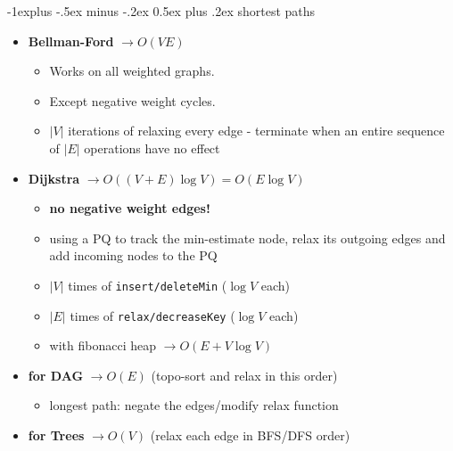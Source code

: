 \documentclass[10pt, landscape]{article}
\makeatletter
\renewcommand{\subsection}{\@startsection{subsection}{2}{0mm}%
                                {-1explus -.5ex minus -.2ex}%
                                {0.5ex plus .2ex}%
                                {\normalfont\normalsize\bfseries}}
\newcommand{\abs}[1]{\vert #1 \vert}
\let\then\rightarrow
\newcommand{\code}[1]{\textcolor{mygreen}{\texttt{#1}}}
\makeatother
\begin{document}
\begin{multicols}{4}
\subsection{shortest paths}
\begin{itemize}
    \item \textbf{Bellman-Ford} $\then O(VE)$
    \begin{itemize}
        \item Works on all weighted graphs.
        \item Except negative weight cycles.
        \item $\abs{V}$ iterations of relaxing every edge - terminate when an entire sequence of $\abs{E}$ operations have no effect
    \end{itemize}
    \item \textbf{Dijkstra} $\then O((V+E)\log V) = O(E\log V)$
    \begin{itemize}
        \item \textbf{no negative weight edges!}
        \item using a PQ to track the min-estimate node, relax its outgoing edges and add incoming nodes to the PQ
        \item $\abs{V}$ times of \code{insert/deleteMin} ($\log V$ each)
        \item $\abs{E}$ times of \code{relax/decreaseKey} ($\log V$ each)
        \item with fibonacci heap $\then O(E + V \log V)$
    \end{itemize}
    \item \textbf{for DAG} $\then O(E)$ (topo-sort and relax in this order)
    \begin{itemize}
        \item longest path: negate the edges/modify relax function
    \end{itemize}
    \item \textbf{for Trees} $\then O(V)$ (relax each edge in BFS/DFS order)
\end{itemize}


\end{multicols}
\end{document}

